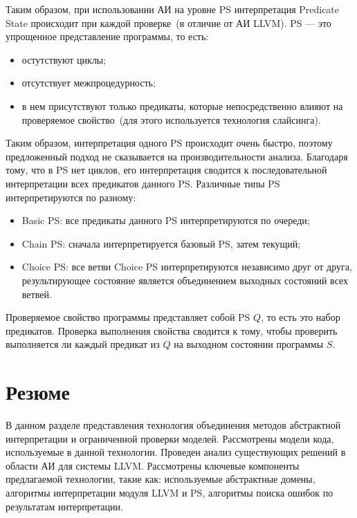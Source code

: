 Таким образом, при использовании АИ на уровне PS интерпретация Predicate 
State происходит при каждой проверке~(в отличие от АИ LLVM). PS --- это
упрощенное представление программы, то есть:
\begin{itemize}
\item остутствуют циклы;
\item отсутствует межпроцедурность;
\item в нем присутствуют только предикаты, которые непосредственно влияют на 
проверяемое свойство~(для этого используется технология слайсинга).
\end{itemize}

Таким образом, интерпретация одного PS происходит очень быстро, поэтому 
предложенный подход не сказывается на производительности анализа. Благодаря 
тому, что в PS нет циклов, его интерпретация сводится к последовательной 
интерпретации всех предикатов данного PS. Различные типы PS интерпретируются 
по разному:
\begin{itemize}
\item Basic PS: все предикаты данного PS интерпретируются по очереди;
\item Chain PS: сначала интерпретируется базовый PS, затем
текущий;
\item Choice PS: все ветви Choice PS интерпретируются независимо друг от
друга, результирующее состояние является объединением выходных состояний всех
ветвей.
\end{itemize}

Проверяемое свойство программы представляет собой PS $Q$, то есть это набор 
предикатов. Проверка выполнения свойства сводится к тому, чтобы проверить
выполняется ли каждый предикат из $Q$ на выходном состоянии программы $S$.

\section{Резюме}
В данном разделе представления технология объединения методов абстрактной
интерпретации и ограниченной проверки моделей. Рассмотрены модели кода, 
используемые в данной технологии. Проведен анализ существующих решений в 
области АИ для системы LLVM. Рассмотрены ключевые компоненты предлагаемой
технологии, такие как: используемые абстрактные домены, алгоритмы интерпретации
модуля LLVM и PS, алгоритмы поиска ошибок по результатам интерпретации.
